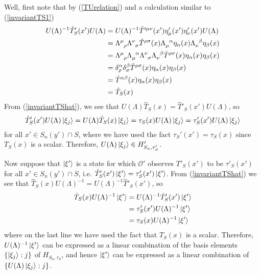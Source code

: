 Well, first note that by (\ref{TUrelation}) and a calculation similar to (\ref{invariantTS1})
\begin{equation}
\begin{split}\label{invariantTShat}
U(\Lambda)^{-1}\hat{T}'_S(x')U(\Lambda)&=U(\Lambda)^{-1}\hat{T}^{\prime\mu\nu}(x')\eta'_{\mu}(x')\eta'_{\nu}(x')U(\Lambda)\\
&=\Lambda\indices{^\mu_\rho}\Lambda\indices{^\nu_\sigma}\hat{T}^{\rho\sigma}(x)\Lambda\indices{_\mu^\alpha}\eta_{\alpha}(x)\Lambda\indices{_\nu^\beta}\eta_{\beta}(x)\\
&=\Lambda\indices{^\mu_\rho}\Lambda\indices{_\mu^\alpha} \Lambda\indices{^\nu_\sigma}\Lambda\indices{_\nu^\beta}\hat{T}^{\rho\sigma}(x)\eta_{\alpha}(x)\eta_{\beta}(x)\\
&=\delta^\alpha_\rho\delta^\beta_\sigma \hat{T}^{\rho\sigma}(x)\eta_{\alpha}(x)\eta_{\beta}(x)\\
&=\hat{T}^{\alpha\beta}(x)\eta_{\alpha}(x)\eta_{\beta}(x)\\
&=\hat{T}_S(x)
\end{split}
\end{equation}
From (\ref{invariantTShat}), we see that  $U(\Lambda)\hat{T}_S(x)=\hat{T}'_S(x')U(\Lambda)$, so
$$
\hat{T}_S'(x')U(\Lambda)\ket{\xi_j}=U(\Lambda)\hat{T}_S(x)\ket{\xi_j}=\tau_S(x)U(\Lambda)\ket{\xi_j}=\tau_S'(x')U(\Lambda)\ket{\xi_j}
$$
for all $x'\in S_n(y')\cap S$, where we have used the fact $\tau_S'(x')=\tau_S(x)$ since $T_S(x)$ is a scalar. Therefore, $U(\Lambda)\ket{\xi_j}\in H'_{S_n,\tau_S'}$. 

Now suppose that $\ket{\xi'}$ is a state for which $\mathcal{O}'$ observes $T'_S(x')$ to be $\tau'_S(x')$ for all $x'\in S_n(y')\cap S$, i.e.  $\hat{T}_S'(x')\ket{\xi'}=\tau_S'(x')\ket{\xi'}$. From (\ref{invariantTShat}) we see that  $\hat{T}_S(x)U(\Lambda)^{-1}=U(\Lambda)^{-1}\hat{T}'_S(x')$, so
\begin{equation}\label{TSUxi}
\begin{split}
\hat{T}_S(x)U(\Lambda)^{-1}\ket{\xi'}&= U(\Lambda)^{-1} \hat{T}_S'(x')\ket{\xi'}\\
&=\tau_S'(x')U(\Lambda)^{-1}\ket{\xi'}\\
&=\tau_S(x)U(\Lambda)^{-1}\ket{\xi'}
\end{split}
\end{equation}
where on the last line we have used the fact that $T_S(x)$ is a scalar. Therefore, $U(\Lambda)^{-1}\ket{\xi'}$ can be expressed as a linear combination of the basis elements $\{\ket{\xi_j}:j\}$ of $H_{S_n,\tau_S}$, and hence  $\ket{\xi'}$  can be expressed as a linear combination of $\{U(\Lambda)\ket{\xi_j}:j\}$. 




